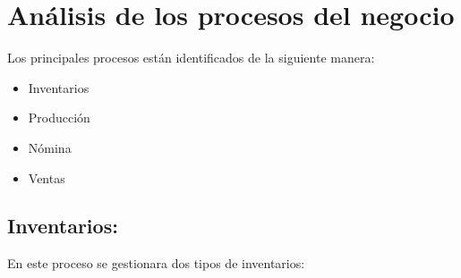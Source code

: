 \section{An\'alisis de los procesos del negocio}
Los principales procesos est\'an identificados de la siguiente manera:%
	\begin{itemize}
		\item Inventarios
		\item Producci\'on
		\item N\'omina
		\item Ventas
	\end{itemize}
\subsection{Inventarios:} En este proceso se gestionara dos tipos de inventarios:
